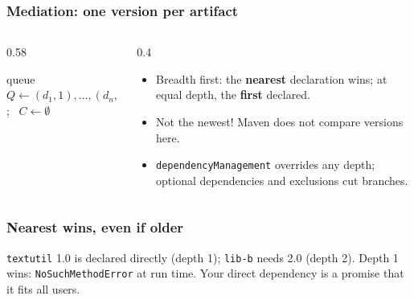\documentclass[aspectratio=169,10pt,compress]{beamer}
\begin{document}
\begin{frame}[t,fragile] \frametitle{Mediation: one version per artifact}
  \begin{columns}[T]
    \begin{column}{0.58\textwidth}


\begin{algorithm}[H]
  \caption{Dependency mediation (Maven 3)}
  queue $Q \leftarrow (d_{1}, 1), \dots, (d_{n}, 1)$; \ $C \leftarrow \emptyset$\;
\end{algorithm}

    \end{column}
    \begin{column}{0.4\textwidth}
      \begin{itemize}\small
        \item Breadth first: the \textbf{nearest} declaration wins; at equal depth, the \textbf{first} declared.
        \item Not the newest! Maven does not compare versions here.
        \item \texttt{dependencyManagement} overrides any depth; optional dependencies and exclusions cut branches.
      \end{itemize}
    \end{column}
  \end{columns}
\end{frame}




\begin{frame}[t,fragile] \frametitle{Nearest wins, even if older}

  \vspace{0.1em}
  \small
  \texttt{textutil} 1.0 is declared directly (depth 1); \texttt{lib-b} needs 2.0 (depth 2). Depth 1 wins: \texttt{NoSuchMethodError} at run time. Your direct dependency is a promise that it fits all users.
\end{frame}
\end{document}
